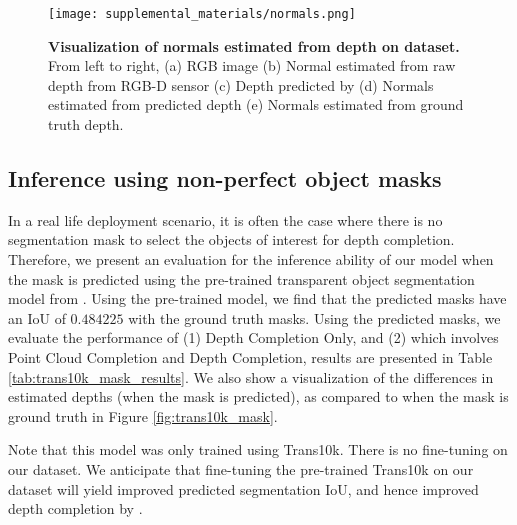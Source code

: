 \begin{figure}[t]
\centering
\texttt{[image: supplemental\_materials/normals.png]}\\
\caption{\textbf{Visualization of normals estimated from depth on \dataName dataset.} From left to right, (a) RGB image (b) Normal estimated from raw depth from RGB-D sensor (c) Depth predicted by \algoName (d) Normals estimated from predicted depth (e) Normals estimated from ground truth depth.
}
\label{fig:normals}
\end{figure}

\subsection{Inference using non-perfect object masks}
In a real life deployment scenario, it is often the case where there is no segmentation mask to select the objects of interest for depth completion. Therefore, we present an evaluation for the inference ability of our model when the mask is predicted using the pre-trained transparent object segmentation model from \citep{TransLab}. Using the pre-trained model, we find that the predicted masks have an IoU of $0.484225$ with the ground truth masks. Using the predicted masks, we evaluate the performance of (1) \algoName Depth Completion Only, and (2) \algoName which involves Point Cloud Completion and Depth Completion, results are presented in Table \ref{tab:trans10k_mask_results}. We also show a visualization of the differences in estimated depths (when the mask is predicted), as compared to when the mask is ground truth in Figure \ref{fig:trans10k_mask}.


Note that this model was only trained using Trans10k. There is no fine-tuning on our dataset. We anticipate that fine-tuning the pre-trained Trans10k \citep{TransLab} on our dataset will yield improved predicted segmentation IoU, and hence improved depth completion by \algoName.

